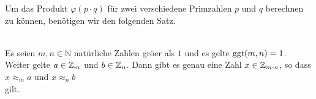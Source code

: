 Um  das Produkt $\varphi(p \cdot q)$ f\"{u}r zwei verschiedene Primzahlen $p$ und $q$ berechnen zu
k\"{o}nnen, ben\"{o}tigen wir den folgenden Satz.

\begin{Satz} \hspace*{\fill} \\
Es seien $m,n \in \mathbb{N}$ nat\"{u}rliche Zahlen gr\"{o}\3er als $1$ und es gelte $\textsl{ggt}(m,n) =1$.
Weiter gelte $a \in \mathbb{Z}_{m}$ und $b \in \mathbb{Z}_{n}$. 
Dann gibt es genau eine Zahl $x \in \mathbb{Z}_{m \cdot n}$, so dass
\\[0.2cm]
\hspace*{1.3cm}
$x \approx_m a$ \quad und \quad $x \approx_n b$
\\[0.2cm]
gilt.
\end{Satz}

